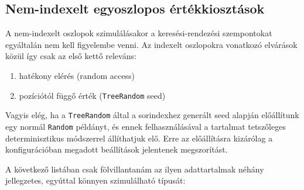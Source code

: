 \documentclass[
    parspace,
    noindent,
    nohyp,
]{elteiktdk}[2023/04/10]
\begin{document}
\subsection{Nem-indexelt egyoszlopos értékkiosztások}

A nem-indexelt oszlopok szimulálásakor a keresési-rendezési szempontokat egyáltalán nem kell figyelembe venni.
Az indexelt oszlopokra vonatkozó elvárások közül így csak az első kettő releváns:

\begin{enumerate}
    \item hatékony elérés (random access)
    \item pozíciótól függő érték (\texttt{TreeRandom} seed)
\end{enumerate}

Vagyis elég, ha a \texttt{TreeRandom} által a sorindexhez generált seed alapján
előállítunk egy normál \texttt{Random} példányt,
és ennek felhasználásával a tartalmat tetszőleges determinisztikus módszerrel állíthatjuk elő.
Erre az előállításra kizárólag a konfigurációban megadott beállítások jelentenek megszorítást.

A következő listában csak fölvillantanám az ilyen adattartalmak néhány jellegzetes,
egyúttal könnyen szimulálható típusát:
\end{document}
